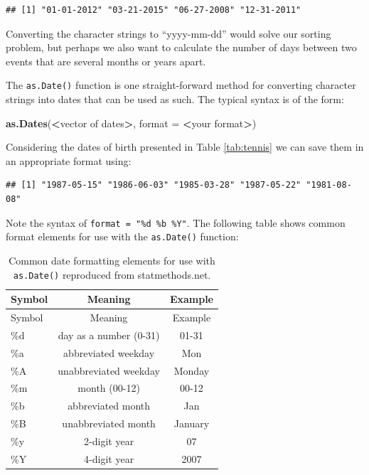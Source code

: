 \documentclass[12pt,]{krantz}
\newenvironment{Shaded}{\begin{snugshade}}{\end{snugshade}}
\newcommand{\KeywordTok}[1]{\textcolor[rgb]{0.27,0.27,0.27}{\textbf{#1}}}
\newcommand{\DataTypeTok}[1]{\textcolor[rgb]{0.27,0.27,0.27}{#1}}
\newcommand{\StringTok}[1]{\textcolor[rgb]{0.5,0.5,0.5}{#1}}
\newcommand{\OperatorTok}[1]{\textcolor[rgb]{0.43,0.43,0.43}{\textbf{#1}}}
\newcommand{\NormalTok}[1]{#1}
\begin{document}
\begin{verbatim}
## [1] "01-01-2012" "03-21-2015" "06-27-2008" "12-31-2011"
\end{verbatim}

Converting the character strings to ``yyyy-mm-dd'' would solve our
sorting problem, but perhaps we also want to calculate the number of
days between two events that are several months or years apart.

The \texttt{as.Date()} function is one straight-forward method for
converting character strings into dates that can be used as such. The
typical syntax is of the form:

\begin{Shaded}
\begin{Highlighting}[]
\KeywordTok{as.Dates}\NormalTok{(}\OperatorTok{<}\NormalTok{vector of dates}\OperatorTok{>}\NormalTok{, }\DataTypeTok{format =} \OperatorTok{<}\NormalTok{your format}\OperatorTok{>}\NormalTok{)}
\end{Highlighting}
\end{Shaded}

Considering the dates of birth presented in Table \ref{tab:tennis} we
can save them in an appropriate format using:

\begin{Shaded}
\end{Shaded}

\begin{verbatim}
## [1] "1987-05-15" "1986-06-03" "1985-03-28" "1987-05-22" "1981-08-08"
\end{verbatim}

Note the syntax of \texttt{format\ =\ "\%d\ \%b\ \%Y"}. The following
table shows common format elements for use with the \texttt{as.Date()}
function:

\begin{longtable}[]{@{}lcc@{}}
\caption{\label{tab:dateFormats} Common date formatting elements for use
with \texttt{as.Date()} reproduced from statmethods.net.}\tabularnewline
\toprule
Symbol & Meaning & Example\tabularnewline
\midrule
\endfirsthead
\toprule
Symbol & Meaning & Example\tabularnewline
\midrule
\endhead
\%d & day as a number (0-31) & 01-31\tabularnewline
\%a & abbreviated weekday & Mon\tabularnewline
\%A & unabbreviated weekday & Monday\tabularnewline
\%m & month (00-12) & 00-12\tabularnewline
\%b & abbreviated month & Jan\tabularnewline
\%B & unabbreviated month & January\tabularnewline
\%y & 2-digit year & 07\tabularnewline
\%Y & 4-digit year & 2007\tabularnewline
\bottomrule
\end{longtable}
\end{document}
